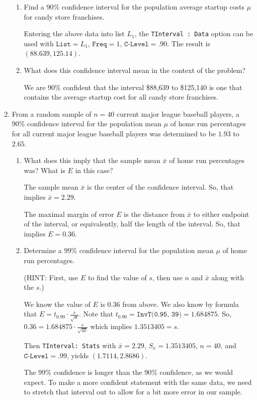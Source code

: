 \begin{enumerate}
	\begin{enumerate}
	\item Find a 90\% confidence interval for the population average startup costs $\mu$ for candy store franchises. 
	
	{\answer Entering the above data into list $L_1$, the \texttt{TInterval : Data} option can be used with 
	$\texttt{List} = L_1$, $\texttt{Freq} = 1$, $\texttt{C-Level} = .90$.  The result is $(88.639, 125.14)$.
	} 
	
	\item What does this confidence interval mean in the context of the problem? 
	
	{\answer We are 90\% confident that the interval \$88,639 to \$125,140 is one that contains the average startup cost for all candy store franchises.
	} 
	\end{enumerate}
	
\item From a random sample of $n=40$ current major league baseball players, a 90\% confidence interval for the population mean $\mu$ of home run percentages for all current major league baseball players was determined to be $1.93$ to $2.65$.

	\begin{enumerate}
	\item What does this imply that the sample mean $\bar x$ of home run percentages was?  What is $E$ in this case? 
	
	{\answer The sample mean $\bar{x}$ is the center of the confidence interval.  So, that implies $\bar{x} = 2.29$. 
	
	The maximal margin of error $E$ is the distance from $\bar{x}$ to either endpoint of the interval, or equivalently, half the length of the interval.  So, that implies $E = 0.36$.
	} 
	
	\item Determine a 99\% confidence interval for the population mean $\mu$ of home run percentages.  
	
	(HINT: First, use $E$ to find the value of $s$, then use $n$ and $\bar{x}$ along with the $s$.) 
	
	{\answer We know the value of $E$ is $0.36$ from above.  We also know by formula that $E = t_{0.90} \cdot \frac{s}{\sqrt{n}}$.  Note that $t_{0.90} = \texttt{InvT(0.95, 39)} = 1.684875$.  So,
	$0.36 = 1.684875 \cdot \frac{s}{\sqrt{40}} $ which implies $1.3513405  = s$. 
	
	Then \texttt{TInterval: Stats} with $\bar{x} = 2.29$, $S_x = 1.3513405$, $n = 40$, and $\texttt{C-Level} = .99$, yields $(1.7114, 2.8686)$. 
	
	The 99\% confidence is longer than the 90\% confidence, as we would expect.  To make a more confident statement with the same data, we need to stretch that interval out to allow for a bit more error in our sample.
	} 
	\end{enumerate}
	
\end{enumerate}

\vfill
